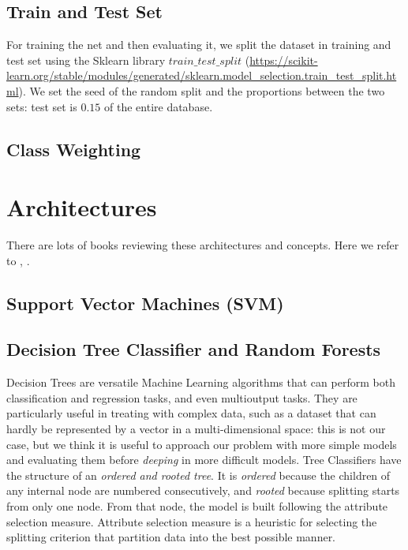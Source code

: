 \documentclass{article}
\begin{document}
\subsection{Train and Test Set}

For training the net and then evaluating it, we split the dataset in training and test set using the Sklearn library $train\_test\_split$ (\url{https://scikit-learn.org/stable/modules/generated/sklearn.model_selection.train_test_split.html}). We set the seed of the random split and the proportions between the two sets: test set is $0.15$ of the entire database.

\subsection{Class Weighting}




\section{Architectures}
There are lots of books reviewing these architectures and concepts. Here we refer to \cite{geron2017hands} , \cite{bishop2006pattern}
\cite{hertz1991introduction}.

\subsection{Support Vector Machines (SVM)}

\subsection{Decision Tree Classifier and Random Forests}

Decision Trees are versatile Machine Learning algorithms that can perform both classification and regression tasks, and even multioutput tasks. They are particularly useful in treating with complex data, such as a dataset that can hardly be represented by a vector in a multi-dimensional space: this is not our case, but we think it is useful to approach our problem with more simple models and evaluating them before \textit{deeping} in more difficult models.
Tree Classifiers have the structure of an \textit{ordered and rooted tree}. It is \textit{ordered} because the children of any internal node are numbered consecutively, and \textit{rooted} because splitting starts from only one node.
From that node, the model is built following the attribute selection measure.
Attribute selection measure is a heuristic for selecting the splitting criterion that partition data into the best possible manner.
\end{document}
